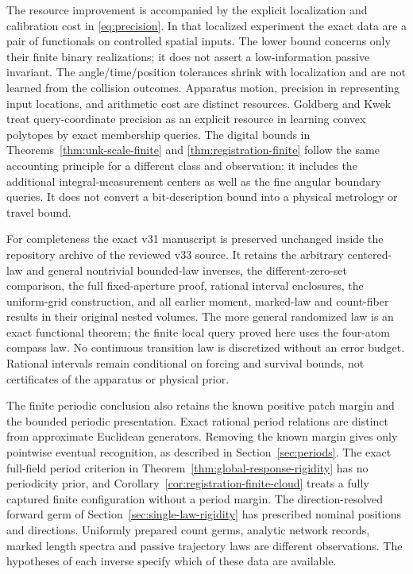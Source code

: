 The resource improvement is accompanied by the explicit localization
and calibration cost in \eqref{eq:precision}. In that localized experiment the exact data are a pair
of functionals on controlled spatial inputs. The lower bound concerns
only their finite binary realizations; it does not assert a low-information
passive invariant. The angle/time/position tolerances shrink with
localization and are not learned from the collision outcomes. Apparatus
motion, precision in representing input locations, and arithmetic
cost are distinct resources. Goldberg and Kwek~\cite{GK} treat
query-coordinate precision as an explicit resource in learning convex
polytopes by exact membership queries. The digital bounds in
Theorems~\ref{thm:unk-scale-finite} and \ref{thm:registration-finite}
follow the same accounting principle
for a different class and observation: it includes the additional
integral-measurement centers as well as the fine angular boundary
queries. It does not convert a bit-description bound into a physical
metrology or travel bound.

For completeness the exact v31 manuscript is preserved unchanged
inside the repository archive of the reviewed v33 source. It retains the arbitrary centered-law and general
nontrivial bounded-law inverses, the different-zero-set comparison,
the full fixed-aperture proof, rational interval enclosures, the
uniform-grid construction, and all earlier moment, marked-law and
count-fiber results in their original nested volumes. The more general
randomized law is an exact functional theorem; the finite local query
proved here uses the four-atom compass law. No continuous transition
law is discretized without an error budget. Rational intervals remain
conditional on forcing and survival bounds, not certificates of the
apparatus or physical prior.

The finite periodic conclusion also retains the known positive patch
margin and the bounded periodic presentation. Exact rational period
relations are distinct from approximate Euclidean generators. Removing
the known margin gives only pointwise eventual recognition, as described
in Section~\ref{sec:periods}. The exact full-field period criterion in
Theorem~\ref{thm:global-response-rigidity} has no periodicity prior,
and Corollary~\ref{cor:registration-finite-cloud} treats a fully
captured finite configuration without a period margin. The direction-resolved forward germ of
Section~\ref{sec:single-law-rigidity} has prescribed nominal positions
and directions. Uniformly prepared count germs, analytic network
records, marked length spectra and passive trajectory laws are
different observations. The hypotheses of each inverse specify
which of these data are available.


